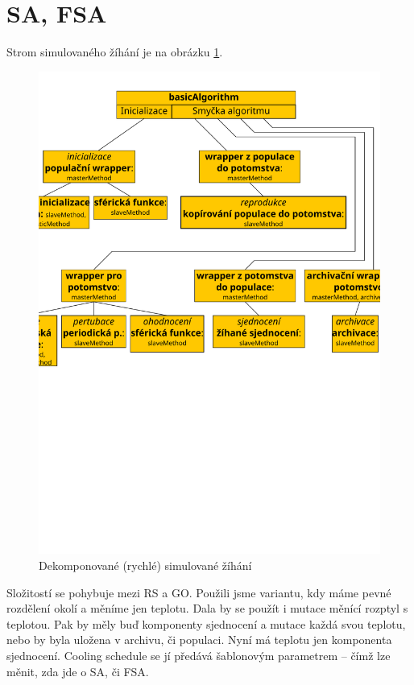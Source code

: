 \section{SA, FSA}

Strom simulovaného žíhání je na obrázku \ref{SA dekomp}.

\begin{figure}[h!]
\begin{center}
  \includegraphics[width=\textwidth]{img/SA}
  \caption{Dekomponované (rychlé) simulované žíhání}\label{SA dekomp}
  \end{center}
\end{figure}

Složitostí se pohybuje mezi RS a GO. Použili jsme variantu, kdy máme pevné rozdělení okolí a měníme jen teplotu. Dala by se použít i mutace měnící rozptyl s teplotou. Pak by měly buď komponenty sjednocení a mutace každá svou teplotu, nebo by byla uložena v archivu, či populaci. Nyní má teplotu jen komponenta sjednocení. Cooling schedule se jí předává šablonovým parametrem -- čímž lze měnit, zda jde o SA, či FSA.

